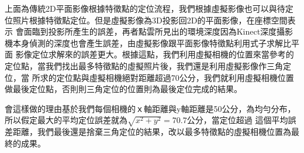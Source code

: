     上面為傳統2D平面影像根據特徵點的定位流程，我們根據虛擬影像也可以與待定位照片根據特徵點定位。但是虛擬影像為3D投影回2D的平面影像，在座標空間表示
    會面臨到投影所產生的誤差，再者點雲所見出的環境深度因為Kinect深度攝影機本身偵測的深度也會產生誤差，由虛擬影像跟平面影像特徵點利用式子求解比平面
    影像定位求解來的誤差更大。根據這點，我們利用虛擬相機的位置來當參考的定位點，當我們找出最多特徵點的虛擬照片後，我們還是利用虛擬影像作三角定位，當
    所求的定位點與虛擬相機絕對距離超過70公分，我們就利用虛擬相機位置做最後定位點，否則則三角定位的位置則為最後定位完成的結果。
    
    會這樣做的理由基於我們每個相機的ｘ軸距離與y軸距離是50公分，為均勻分布，所以假定最大的平均定位誤差就為$\sqrt{x^2+y^2}=70.7$公分，當定位超過
    這個平均誤差距離，我們最後還是捨棄三角定位的結果，改以最多特徵點的虛擬相機位置為最終的成果。
